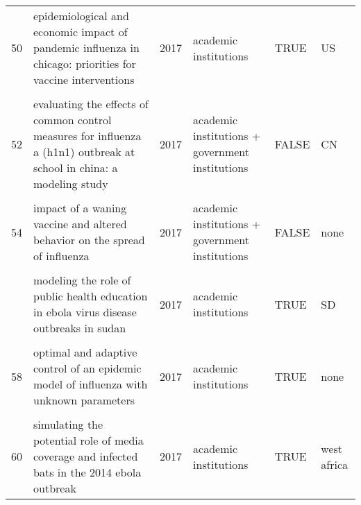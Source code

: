 \documentclass[
]{article}
\begin{document}
\begin{landscape}
\begin{longtable}{l>{\raggedright\arraybackslash}p{4cm}l>{\raggedright\arraybackslash}p{3.5cm}l>{\raggedright\arraybackslash}p{1.5cm}}
50 & epidemiological and economic impact of pandemic influenza in chicago: priorities for vaccine interventions & 2017 & academic institutions & TRUE & US\\
\addlinespace
\cellcolor{gray!6}{51} & \cellcolor{gray!6}{estimating direct and indirect protective effect of influenza vaccination in the united states} & \cellcolor{gray!6}{2017} & \cellcolor{gray!6}{academic institutions + government institutions} & \cellcolor{gray!6}{FALSE} & \cellcolor{gray!6}{US}\\
52 & evaluating the effects of common control measures for influenza a (h1n1) outbreak at school in china: a modeling study & 2017 & academic institutions + government institutions & FALSE & CN\\
\cellcolor{gray!6}{53} & \cellcolor{gray!6}{evaluation of strategies to control a potential outbreak of foot-and-mouth disease in sweden} & \cellcolor{gray!6}{2017} & \cellcolor{gray!6}{government institutions} & \cellcolor{gray!6}{FALSE} & \cellcolor{gray!6}{SE}\\
54 & impact of a waning vaccine and altered behavior on the spread of influenza & 2017 & academic institutions + government institutions & FALSE & none\\
\cellcolor{gray!6}{55} & \cellcolor{gray!6}{mathematical models for devising the optimal ebola virus disease eradication} & \cellcolor{gray!6}{2017} & \cellcolor{gray!6}{academic institutions} & \cellcolor{gray!6}{TRUE} & \cellcolor{gray!6}{LR}\\
\addlinespace
56 & modeling the role of public health education in ebola virus disease outbreaks in sudan & 2017 & academic institutions & TRUE & SD\\
\cellcolor{gray!6}{57} & \cellcolor{gray!6}{modelling the transmission and control strategies of varicella among school children in shenzhen, china} & \cellcolor{gray!6}{2017} & \cellcolor{gray!6}{academic institutions + government institutions} & \cellcolor{gray!6}{FALSE} & \cellcolor{gray!6}{CN}\\
58 & optimal and adaptive control of an epidemic model of influenza with unknown parameters & 2017 & academic institutions & TRUE & none\\
\cellcolor{gray!6}{59} & \cellcolor{gray!6}{simulating endogenous dynamics of intervention-capacity deployment: ebola outbreak in liberia} & \cellcolor{gray!6}{2017} & \cellcolor{gray!6}{academic institutions + NGO} & \cellcolor{gray!6}{FALSE} & \cellcolor{gray!6}{LR}\\
60 & simulating the potential role of media coverage and infected bats in the 2014 ebola outbreak & 2017 & academic institutions & TRUE & west africa\\

\end{longtable}
\end{landscape}
\end{document}
